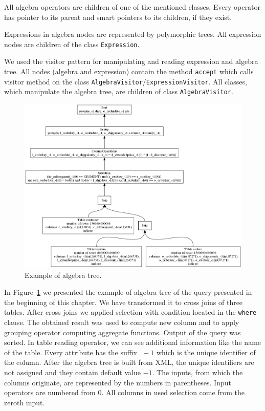 All algebra operators are children of one of the mentioned classes. Every operator has pointer to its parent and smart pointers to its children, if they exist. 

Expressions in algebra nodes are represented by polymorphic trees. All expression nodes are children of the class \texttt{Expression}.

We used the visitor pattern for manipulating and reading expression and algebra tree. All nodes (algebra and expression) contain the method \texttt{accept} which calls visitor method on the class \texttt{AlgebraVisitor}/\texttt{ExpressionVisitor}. All classes, which manipulate the algebra tree, are children of class \texttt{AlgebraVisitor}.


\begin{figure}[h!]
  \centering
    \includegraphics[width=1.0\textwidth]{algebratree1}

      \caption{Example of algebra tree.}
          \label{fig:algebratree1}
\end{figure}

In Figure~\ref{fig:algebratree1} we presented the example of algebra tree of the query presented in the beginning of this chapter. We have transformed it to cross joins of three tables. After cross joins we applied selection with condition located in the \verb|where| clause. The obtained result was used to compute new column and to apply grouping operator computing aggregate functions. Output of the query was sorted. In table reading operator, we can see additional information like the name of the table. Every attribute has the suffix $\_-1$ which is the unique identifier of the column. After the algebra tree is built from XML, the unique identifiers are not assigned and they contain default value $-1$. The inputs, from which the columns originate, are represented by the numbers in parentheses. Input operators are numbered from $0$. All columns in used selection come from the zeroth input.

